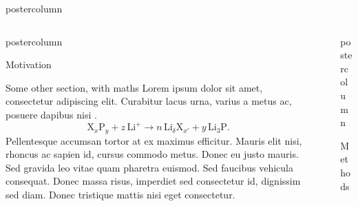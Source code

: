 \documentclass{beamer}
\newlength{\columnheight}
\begin{document}
\begin{frame}
\begin{columns}
\begin{column}{.57\textwidth}
\begin{beamercolorbox}[center]{postercolumn}
\begin{minipage}{.98\textwidth}
{\begin{columns}
\begin{column}{.48\textwidth}
\begin{beamercolorbox}[left]{postercolumn}
\begin{minipage}{\textwidth}
{\begin{myblock}{Motivation}
            \end{myblock}

          \begin{myblock}{Some other section, with maths}
              Lorem ipsum dolor sit amet, consectetur adipiscing elit. Curabitur lacus urna, varius a metus ac, posuere dapibus nisi \cite{Dummy2019}.
              \[ \text{X}_x \text{P}_y + z\,\text{Li}^+ \to n\,\text{Li}_\delta\text{X}_{x'} + y\,\text{Li}_3\text{P}.\]
              Pellentesque accumsan tortor at ex maximus efficitur. Mauris elit nisi, rhoncus ac sapien id, cursus commodo metus. Donec eu justo mauris. Sed gravida leo vitae quam pharetra euismod. Sed faucibus vehicula consequat. Donec massa risus, imperdiet sed consectetur id, dignissim sed diam. Donec tristique mattis nisi eget consectetur.
          \end{myblock}

      }\end{minipage}\end{beamercolorbox}
  \end{column}

  \begin{column}{.00\textwidth}
  \end{column}

  \begin{column}{.48\textwidth}
    \begin{beamercolorbox}[right]{postercolumn}
      \begin{minipage}{\textwidth} %
        \parbox[t][\columnheight]{\textwidth}{ %
            \begin{myblock}{Methods}
            \end{myblock}\vfill

    }\end{minipage}\end{beamercolorbox}
  \end{column}
  \end{columns}

    }\end{minipage}\end{beamercolorbox}
  \end{column}
    

\end{columns}
\end{frame}
\end{document}
